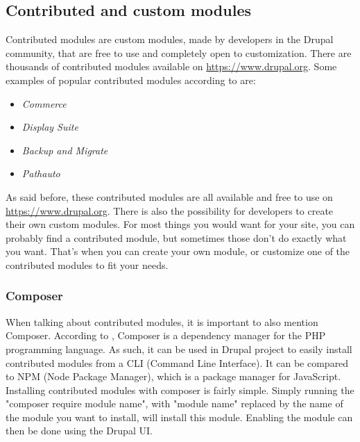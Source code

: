 
\subsection{Contributed and custom modules}

Contributed modules are custom modules, made by developers in the Drupal community, that are free to use and completely open to customization. There are thousands of contributed modules available on \url{https://www.drupal.org}. Some examples of popular contributed modules according to \textcite{Tomlinson2015} are: 

\begin{itemize}
	\item  \emph{Commerce}
	\item  \emph{Display Suite}
	\item  \emph{Backup and Migrate}
	\item  \emph{Pathauto}
\end{itemize}

As said before, these contributed modules are all available and free to use on \url{https://www.drupal.org}. There is also the possibility for developers to create their own custom modules. For most things you would want for your site, you can probably find a contributed module, but sometimes those don't do exactly what you want. That's when you can create your own module, or customize one of the contributed modules to fit your needs.

\subsubsection{Composer}
\label{sss:composer}

When talking about contributed modules, it is important to also mention \gls{Composer}. According to \textcite{M.Kromann2018}, Composer is a dependency manager for the PHP programming language. As such, it can be used in Drupal project to easily install contributed modules from a \gls{CLI} (Command Line Interface). It can be compared to \gls{NPM} (Node Package Manager), which is a package manager for JavaScript. Installing contributed modules with composer is fairly simple. Simply running the "composer require {module name}", with "{module name}" replaced by the name of the module you want to install, will install this module. Enabling the module can then be done using the Drupal UI.



